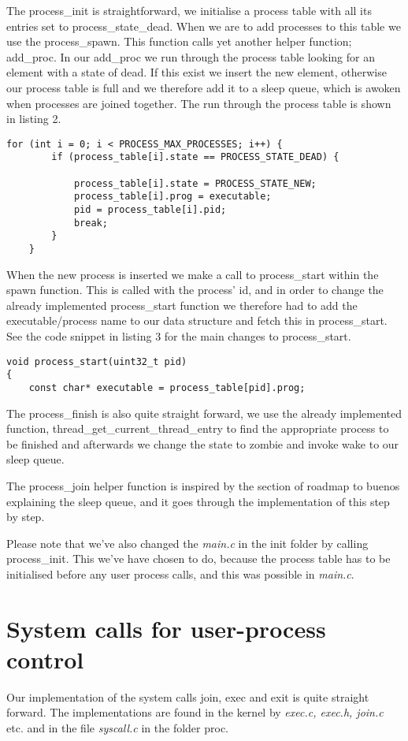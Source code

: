\documentclass[12pt,a4paper,danish]{article}
\begin{document}
The process\_init is straightforward, we initialise a process table with all its entries set to process\_state\_dead. When we are to add processes to this table we use the process\_spawn. This function calls yet another helper function; add\_proc. In our add\_proc we run through the process table looking for an element with a state of dead. If this exist we insert the new element, otherwise our process table is full and we therefore add it to a sleep queue, which is awoken when processes are joined together. The run through the process table is shown in listing 2.
\newpage
\begin{lstlisting}[caption=Running through the process table inserting a new process.]
    for (int i = 0; i < PROCESS_MAX_PROCESSES; i++) {
        if (process_table[i].state == PROCESS_STATE_DEAD) {
            
            process_table[i].state = PROCESS_STATE_NEW;
            process_table[i].prog = executable;
            pid = process_table[i].pid;
            break;
        }
    }
\end{lstlisting}

When the new process is inserted we make a call to process\_start within the spawn function. This is called with the process' id, and in order to change the already implemented process\_start function we therefore had to add the executable/process name to our data structure and fetch this in process\_start. See the code snippet in listing 3 for the main changes to process\_start.
\begin{lstlisting}[caption= Changes made to process\_start]
void process_start(uint32_t pid)
{
    const char* executable = process_table[pid].prog;
\end{lstlisting}
The process\_finish is also quite straight forward, we use the already implemented function, thread\_get\_current\_thread\_entry to find the appropriate process to be finished and afterwards we change the state to zombie and invoke wake to our sleep queue.

The process\_join helper function is inspired by the section of roadmap to buenos explaining the sleep queue, and it goes through the implementation of this step by step.

Please note that we've also changed the \textit{main.c} in the init folder by calling process\_init. This we've have chosen to do, because the process table has to be initialised before any user process calls, and this was possible in \textit{main.c}.

\section{System calls for user-process control}
Our implementation of the system calls join, exec and exit is quite straight forward. The implementations are found in the kernel by \textit{exec.c, exec.h, join.c} etc. and in the file \textit{syscall.c} in the folder proc.
\end{document}
